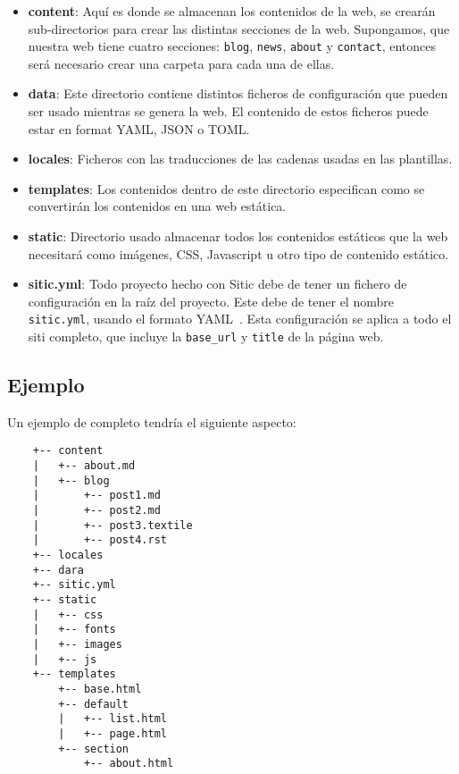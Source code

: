 \begin{itemize}
    \item \textbf{content}: Aquí es donde se almacenan los contenidos de la web, se crearán
        sub-directorios para crear las distintas secciones de la web. Supongamos, que nuestra web
        tiene cuatro secciones: \texttt{blog}, \texttt{news}, \texttt{about} y \texttt{contact},
        entonces será necesario crear una carpeta para cada una de ellas.
    \item \textbf{data}: Este directorio contiene distintos ficheros de configuración que pueden
        ser usado mientras se genera la web. El contenido de estos ficheros puede estar en format
        YAML, JSON o TOML.
    \item \textbf{locales}: Ficheros con las traducciones de las cadenas usadas en las plantillas.
    \item \textbf{templates}: Los contenidos dentro de este directorio especifican como se convertirán
        los contenidos en una web estática.
    \item \textbf{static}: Directorio usado almacenar todos los contenidos estáticos que la web
        necesitará como imágenes, CSS, Javascript u otro tipo de contenido estático.
    \item \textbf{sitic.yml}: Todo proyecto hecho con Sitic debe de tener un fichero
        de configuración en la raíz del proyecto. Este debe de tener el nombre \texttt{sitic.yml},
        usando el formato YAML~\cite{yaml}. Esta configuración se aplica a todo el siti completo,
        que incluye la \texttt{base\_url} y \texttt{title} de la página web.
\end{itemize}

\subsection{Ejemplo}
Un ejemplo de completo tendría el siguiente aspecto:

\begin{verbatim}
    +-- content
    |   +-- about.md
    |   +-- blog
    |       +-- post1.md
    |       +-- post2.md
    |       +-- post3.textile
    |       +-- post4.rst
    +-- locales
    +-- dara
    +-- sitic.yml
    +-- static
    |   +-- css
    |   +-- fonts
    |   +-- images
    |   +-- js
    +-- templates
        +-- base.html
        +-- default
        |   +-- list.html
        |   +-- page.html
        +-- section
            +-- about.html
\end{verbatim}

